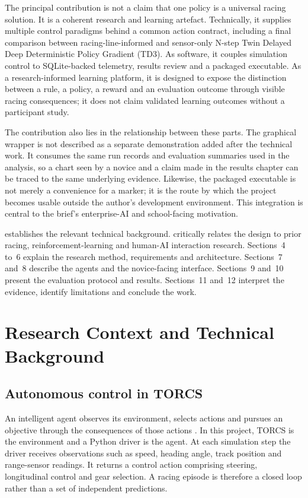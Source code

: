 The principal contribution is not a claim that one policy is a universal racing solution. It is a coherent research and learning artefact. Technically, it supplies multiple control paradigms behind a common action contract, including a final comparison between racing-line-informed and sensor-only N-step Twin Delayed Deep Deterministic Policy Gradient (TD3). As software, it couples simulation control to SQLite-backed telemetry, results review and a packaged executable. As a research-informed learning platform, it is designed to expose the distinction between a rule, a policy, a reward and an evaluation outcome through visible racing consequences; it does not claim validated learning outcomes without a participant study.

The contribution also lies in the relationship between these parts. The graphical wrapper is not described as a separate demonstration added after the technical work. It consumes the same run records and evaluation summaries used in the analysis, so a chart seen by a novice and a claim made in the results chapter can be traced to the same underlying evidence. Likewise, the packaged executable is not merely a convenience for a marker; it is the route by which the project becomes usable outside the author's development environment. This integration is central to the brief's enterprise-AI and school-facing motivation.

 establishes the relevant technical background.  critically relates the design to prior racing, reinforcement-learning and human-AI interaction research. Sections~4 to~6 explain the research method, requirements and architecture. Sections~7 and~8 describe the agents and the novice-facing interface. Sections~9 and~10 present the evaluation protocol and results. Sections~11 and~12 interpret the evidence, identify limitations and conclude the work.

\section{Research Context and Technical Background}
\label{ch:research-context}

\subsection{Autonomous control in TORCS}

An intelligent agent observes its environment, selects actions and pursues an objective through the consequences of those actions \parencite{russellnorvig2021}. In this project, TORCS is the environment and a Python driver is the agent. At each simulation step the driver receives observations such as speed, heading angle, track position and range-sensor readings. It returns a control action comprising steering, longitudinal control and gear selection. A racing episode is therefore a closed loop rather than a set of independent predictions.

